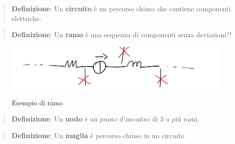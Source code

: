 \begin{quotation}
    \textbf{Definizione}: Un \textbf{circuito} è un percorso chiuso che contiene componenti elettriche.
\end{quotation}

\begin{quotation}
    \textbf{Definizione}: Un \textbf{ramo} è una sequenza di componenti senza deviazioni?!
\end{quotation}
\begin{figure}[H]
    \centering
    \includegraphics[width=0.5\linewidth]{1 - circuiti DC/imgs/Screenshot from 2022-06-09 22-43-00.png}
    \label{fig:rami}
    \caption{Esempio di ramo}
\end{figure}

\begin{quotation}
    \textbf{Definizione}: Un \textbf{nodo} è un punto d'incontro di 3 o più rami.
\end{quotation}

\begin{quotation}
    \textbf{Definizione}: Un \textbf{maglia} è percorso chiuso in un circuito
\end{quotation}